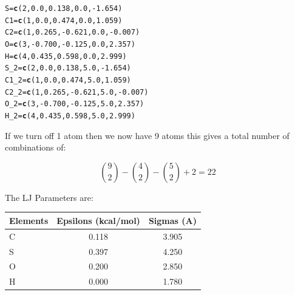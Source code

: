 \documentclass{article}\usepackage[]{graphicx}\usepackage[]{color}
\makeatletter
\newcommand{\hlnum}[1]{\textcolor[rgb]{0.686,0.059,0.569}{#1}}%
\newcommand{\hlopt}[1]{\textcolor[rgb]{0,0,0}{#1}}%
\newcommand{\hlstd}[1]{\textcolor[rgb]{0.345,0.345,0.345}{#1}}%
\newcommand{\hlkwb}[1]{\textcolor[rgb]{0.69,0.353,0.396}{#1}}%
\newcommand{\hlkwd}[1]{\textcolor[rgb]{0.737,0.353,0.396}{\textbf{#1}}}%
\newenvironment{kframe}{%
 \def\at@end@of@kframe{}%
 \ifinner\ifhmode%
  \def\at@end@of@kframe{\end{minipage}}%
  \begin{minipage}{\columnwidth}%
 \fi\fi%
 \def\FrameCommand##1{\hskip\@totalleftmargin \hskip-\fboxsep
 \colorbox{shadecolor}{##1}\hskip-\fboxsep
     \hskip-\linewidth \hskip-\@totalleftmargin \hskip\columnwidth}%
 \MakeFramed {\advance\hsize-\width
   \@totalleftmargin\z@ \linewidth\hsize
   \@setminipage}}%
 {\par\unskip\endMakeFramed%
 \at@end@of@kframe}
\newenvironment{knitrout}{}{} %
\makeatother
\begin{document}
\begin{knitrout}
\color{fgcolor}\begin{kframe}
\begin{alltt}
  \hlstd{S}\hlkwb{=}\hlkwd{c}\hlstd{(}\hlnum{2}\hlstd{,}\hlnum{0.0}\hlstd{,}\hlnum{0.138}\hlstd{,}\hlnum{0.0}\hlstd{,}\hlopt{-}\hlnum{1.654}\hlstd{)}
  \hlstd{C1}\hlkwb{=}\hlkwd{c}\hlstd{(}\hlnum{1}\hlstd{,}\hlnum{0.0}\hlstd{,}\hlnum{0.474}\hlstd{,}\hlnum{0.0}\hlstd{,}\hlnum{1.059}\hlstd{)}
  \hlstd{C2}\hlkwb{=}\hlkwd{c}\hlstd{(}\hlnum{1}\hlstd{,}\hlnum{0.265}\hlstd{,}\hlopt{-}\hlnum{0.621}\hlstd{,}\hlnum{0.0}\hlstd{,}\hlopt{-}\hlnum{0.007}\hlstd{)}
  \hlstd{O}\hlkwb{=}\hlkwd{c}\hlstd{(}\hlnum{3}\hlstd{,}\hlopt{-}\hlnum{0.700}\hlstd{,}\hlopt{-}\hlnum{0.125}\hlstd{,}\hlnum{0.0}\hlstd{,}\hlnum{2.357}\hlstd{)}
  \hlstd{H}\hlkwb{=}\hlkwd{c}\hlstd{(}\hlnum{4}\hlstd{,}\hlnum{0.435}\hlstd{,}\hlnum{0.598}\hlstd{,}\hlnum{0.0}\hlstd{,}\hlnum{2.999}\hlstd{)}
  \hlstd{S_2}\hlkwb{=}\hlkwd{c}\hlstd{(}\hlnum{2}\hlstd{,}\hlnum{0.0}\hlstd{,}\hlnum{0.138}\hlstd{,}\hlnum{5.0}\hlstd{,}\hlopt{-}\hlnum{1.654}\hlstd{)}
  \hlstd{C1_2}\hlkwb{=}\hlkwd{c}\hlstd{(}\hlnum{1}\hlstd{,}\hlnum{0.0}\hlstd{,}\hlnum{0.474}\hlstd{,}\hlnum{5.0}\hlstd{,}\hlnum{1.059}\hlstd{)}
  \hlstd{C2_2}\hlkwb{=}\hlkwd{c}\hlstd{(}\hlnum{1}\hlstd{,}\hlnum{0.265}\hlstd{,}\hlopt{-}\hlnum{0.621}\hlstd{,}\hlnum{5.0}\hlstd{,}\hlopt{-}\hlnum{0.007}\hlstd{)}
  \hlstd{O_2}\hlkwb{=}\hlkwd{c}\hlstd{(}\hlnum{3}\hlstd{,}\hlopt{-}\hlnum{0.700}\hlstd{,}\hlopt{-}\hlnum{0.125}\hlstd{,}\hlnum{5.0}\hlstd{,}\hlnum{2.357}\hlstd{)}
  \hlstd{H_2}\hlkwb{=}\hlkwd{c}\hlstd{(}\hlnum{4}\hlstd{,}\hlnum{0.435}\hlstd{,}\hlnum{0.598}\hlstd{,}\hlnum{5.0}\hlstd{,}\hlnum{2.999}\hlstd{)}
\end{alltt}
\end{kframe}
\end{knitrout}

If we turn off 1 atom then we now have 9 atoms this gives a total number of combinations of:

\[\binom{9}{2}-\binom{4}{2}-\binom{5}{2}+2=22 \]


The LJ Parameters are:

\begin{table}[ht]
\centering
\begin{tabular}{|l||c||c|}
  \hline
Elements & Epsilons (kcal/mol) & Sigmas (A) \\ 
  \hline
C & 0.118 & 3.905 \\ 
  S & 0.397 & 4.250 \\ 
  O & 0.200 & 2.850 \\ 
  H & 0.000 & 1.780 \\ 
   \hline
\end{tabular}
\end{table}
\end{document}
